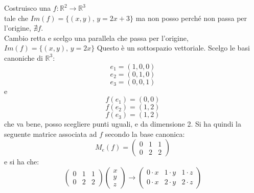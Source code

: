 \documentclass[a4paper,12pt, oneside]{book}
\begin{document}
\begin{esercizio}
Costruisco una $f:\mathbb{R}^2\rightarrow \mathbb{R}^3$\\ tale che $Im(f)=\{(x,y),\, y=2x+3\}$
ma non posso perché non passa per l'origine, $\nexists f$.\\
Cambio retta e scelgo una parallela che passa per l'origine,\\ $Im(f)=\{(x,y),\, y=2x\}$
Questo è un sottospazio vettoriale.
Scelgo le basi canoniche di $\mathbb{R}^3$:
$$e_1=(1,0,0)$$
$$e_2=(0,1,0)$$
$$e_3=(0,0,1)$$
e 
$$f(e_1)=(0,0)$$
$$f(e_2)=(1,2)$$
$$f(e_3)=(1,2)$$
che va bene, posso scegliere punti uguali, e da dimensione 2. Si ha quindi la seguente matrice associata ad $f$ secondo la base canonica:
$$
M_e(f)=\left(\begin{matrix}
0 & 1 & 1\\
0 & 2 & 2
\end{matrix}\right)
$$
e si ha che:
$$\left(\begin{matrix}
0 & 1 & 1\\
0 & 2 & 2
\end{matrix}\right)\left(\begin{matrix}
x\\
y\\
z
\end{matrix}\right)\rightarrow \left(\begin{matrix}
0 \cdot x & 1 \cdot y & 1\cdot z\\
0 \cdot x & 2 \cdot y & 2\cdot z
\end{matrix}\right)$$
\end{esercizio}
\end{document}
